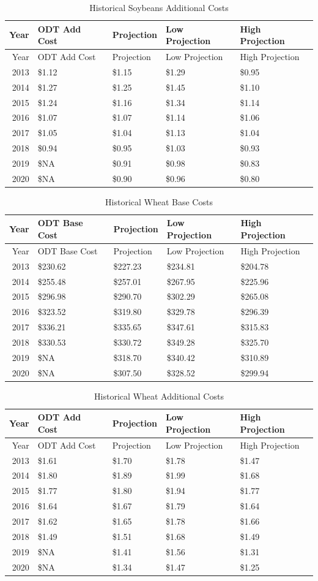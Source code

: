 \documentclass[]{article}
\begin{document}
\begin{longtable}[]{@{}rllll@{}}
\caption{Historical Soybeans Additional Costs}\tabularnewline
\toprule
Year & ODT Add Cost & Projection & Low Projection & High
Projection\tabularnewline
\midrule
\endfirsthead
\toprule
Year & ODT Add Cost & Projection & Low Projection & High
Projection\tabularnewline
\midrule
\endhead
2013 & \$1.12 & \$1.15 & \$1.29 & \$0.95\tabularnewline
2014 & \$1.27 & \$1.25 & \$1.45 & \$1.10\tabularnewline
2015 & \$1.24 & \$1.16 & \$1.34 & \$1.14\tabularnewline
2016 & \$1.07 & \$1.07 & \$1.14 & \$1.06\tabularnewline
2017 & \$1.05 & \$1.04 & \$1.13 & \$1.04\tabularnewline
2018 & \$0.94 & \$0.95 & \$1.03 & \$0.93\tabularnewline
2019 & \$NA & \$0.91 & \$0.98 & \$0.83\tabularnewline
2020 & \$NA & \$0.90 & \$0.96 & \$0.80\tabularnewline
\bottomrule
\end{longtable}

\newpage

\begin{longtable}[]{@{}rllll@{}}
\caption{Historical Wheat Base Costs}\tabularnewline
\toprule
Year & ODT Base Cost & Projection & Low Projection & High
Projection\tabularnewline
\midrule
\endfirsthead
\toprule
Year & ODT Base Cost & Projection & Low Projection & High
Projection\tabularnewline
\midrule
\endhead
2013 & \$230.62 & \$227.23 & \$234.81 & \$204.78\tabularnewline
2014 & \$255.48 & \$257.01 & \$267.95 & \$225.96\tabularnewline
2015 & \$296.98 & \$290.70 & \$302.29 & \$265.08\tabularnewline
2016 & \$323.52 & \$319.80 & \$329.78 & \$296.39\tabularnewline
2017 & \$336.21 & \$335.65 & \$347.61 & \$315.83\tabularnewline
2018 & \$330.53 & \$330.72 & \$349.28 & \$325.70\tabularnewline
2019 & \$NA & \$318.70 & \$340.42 & \$310.89\tabularnewline
2020 & \$NA & \$307.50 & \$328.52 & \$299.94\tabularnewline
\bottomrule
\end{longtable}

\begin{longtable}[]{@{}rllll@{}}
\caption{Historical Wheat Additional Costs}\tabularnewline
\toprule
Year & ODT Add Cost & Projection & Low Projection & High
Projection\tabularnewline
\midrule
\endfirsthead
\toprule
Year & ODT Add Cost & Projection & Low Projection & High
Projection\tabularnewline
\midrule
\endhead
2013 & \$1.61 & \$1.70 & \$1.78 & \$1.47\tabularnewline
2014 & \$1.80 & \$1.89 & \$1.99 & \$1.68\tabularnewline
2015 & \$1.77 & \$1.80 & \$1.94 & \$1.77\tabularnewline
2016 & \$1.64 & \$1.67 & \$1.79 & \$1.64\tabularnewline
2017 & \$1.62 & \$1.65 & \$1.78 & \$1.66\tabularnewline
2018 & \$1.49 & \$1.51 & \$1.68 & \$1.49\tabularnewline
2019 & \$NA & \$1.41 & \$1.56 & \$1.31\tabularnewline
2020 & \$NA & \$1.34 & \$1.47 & \$1.25\tabularnewline
\bottomrule
\end{longtable}
\end{document}
